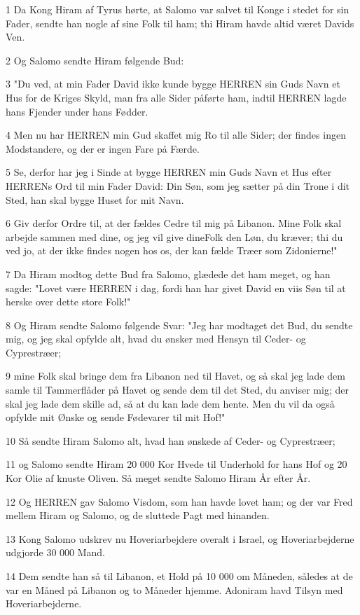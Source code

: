 \par 1 Da Kong Hiram af Tyrus hørte, at Salomo var salvet til Konge i stedet for sin Fader, sendte han nogle af sine Folk til ham; thi Hiram havde altid været Davids Ven.
\par 2 Og Salomo sendte Hiram følgende Bud:
\par 3 "Du ved, at min Fader David ikke kunde bygge HERREN sin Guds Navn et Hus for de Kriges Skyld, man fra alle Sider påførte ham, indtil HERREN lagde hans Fjender under hans Fødder.
\par 4 Men nu har HERREN min Gud skaffet mig Ro til alle Sider; der findes ingen Modstandere, og der er ingen Fare på Færde.
\par 5 Se, derfor har jeg i Sinde at bygge HERREN min Guds Navn et Hus efter HERRENs Ord til min Fader David: Din Søn, som jeg sætter på din Trone i dit Sted, han skal bygge Huset for mit Navn.
\par 6 Giv derfor Ordre til, at der fældes Cedre til mig på Libanon. Mine Folk skal arbejde sammen med dine, og jeg vil give dineFolk den Løn, du kræver; thi du ved jo, at der ikke findes nogen hos os, der kan fælde Træer som Zidonierne!"
\par 7 Da Hiram modtog dette Bud fra Salomo, glædede det ham meget, og han sagde: "Lovet være HERREN i dag, fordi han har givet David en viis Søn til at herske over dette store Folk!"
\par 8 Og Hiram sendte Salomo følgende Svar: "Jeg har modtaget det Bud, du sendte mig, og jeg skal opfylde alt, hvad du ønsker med Hensyn til Ceder- og Cyprestræer;
\par 9 mine Folk skal bringe dem fra Libanon ned til Havet, og så skal jeg lade dem samle til Tømmerflåder på Havet og sende dem til det Sted, du anviser mig; der skal jeg lade dem skille ad, så at du kan lade dem hente. Men du vil da også opfylde mit Ønske og sende Fødevarer til mit Hof!"
\par 10 Så sendte Hiram Salomo alt, hvad han ønskede af Ceder- og Cyprestræer;
\par 11 og Salomo sendte Hiram 20 000 Kor Hvede til Underhold for hans Hof og 20 Kor Olie af knuste Oliven. Så meget sendte Salomo Hiram År efter År.
\par 12 Og HERREN gav Salomo Visdom, som han havde lovet ham; og der var Fred mellem Hiram og Salomo, og de sluttede Pagt med hinanden.
\par 13 Kong Salomo udskrev nu Hoveriarbejdere overalt i Israel, og Hoveriarbejderne udgjorde 30 000 Mand.
\par 14 Dem sendte han så til Libanon, et Hold på 10 000 om Måneden, således at de var en Måned på Libanon og to Måneder hjemme. Adoniram havd Tilsyn med Hoveriarbejderne.
